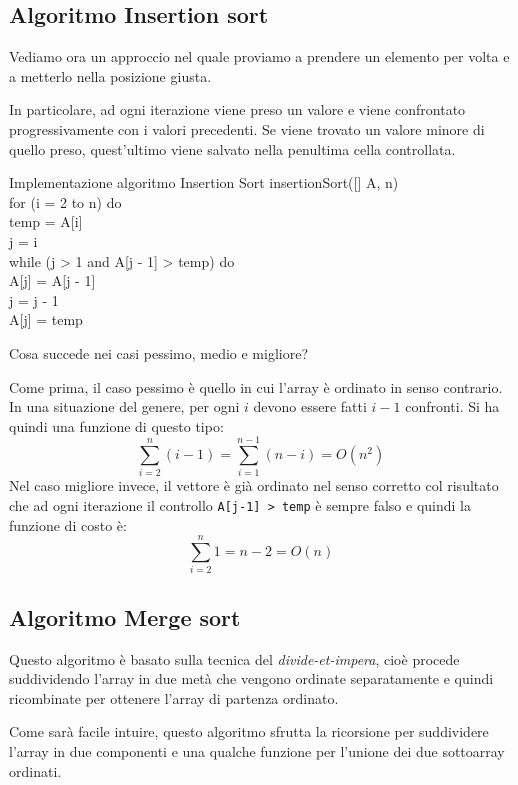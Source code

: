 \subsection{Algoritmo Insertion sort}
Vediamo ora un approccio nel quale proviamo a prendere un elemento per volta e
a metterlo nella posizione giusta.

In particolare, ad ogni iterazione viene preso un valore e viene confrontato
progressivamente con i valori precedenti. Se viene trovato un valore minore di
quello preso, quest'ultimo viene salvato nella penultima cella
controllata.
\begin{code}{Implementazione algoritmo Insertion Sort}
\noindent\rmbreak\ind insertionSort([] A,  n)\\
    for (i = 2 to n) do\\
        \indf {} temp = A[i]\\
         j = i\\
        while (j > 1 and A[j - 1] > temp) do\\
            \indff A[j] = A[j - 1]\\
            j = j - 1\\
        \indf A[j] = temp
\end{code}\noindent
Cosa succede nei casi pessimo, medio e migliore?

\bigskip\noindent
Come prima, il caso pessimo è quello in cui l'array è ordinato in senso
contrario. In una situazione del genere, per ogni $i$ devono essere fatti $i-1$
confronti. Si ha quindi una funzione di questo tipo:
\[\sum_{i=2}^n(i-1)=\sum_{i=1}^{n-1}(n-i)=O(n^2)\]
Nel caso migliore invece, il vettore è già ordinato nel senso corretto col
risultato che ad ogni iterazione il controllo \texttt{A[j-1] > temp} è sempre
falso e quindi la funzione di costo è:
\[\sum_{i=2}^n1=n-2=O(n)\]

\hypertarget{sec:merge_sort}{\subsection{Algoritmo Merge sort}}
Questo algoritmo è basato sulla tecnica del \emph{divide-et-impera}, cioè procede
suddividendo l'array in due metà che vengono ordinate separatamente e quindi
ricombinate per ottenere l'array di partenza ordinato.

Come sarà facile intuire, questo algoritmo sfrutta la ricorsione per suddividere
l'array in due componenti e una qualche funzione per l'unione dei due sottoarray
ordinati.

